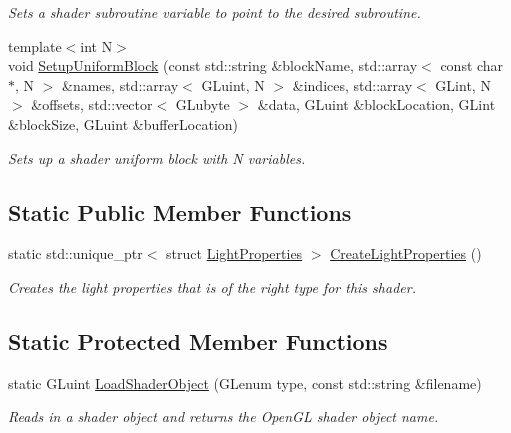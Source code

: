 \begin{DoxyCompactItemize}
\begin{DoxyCompactList}\small\item\em Sets a shader subroutine variable to point to the desired subroutine. \end{DoxyCompactList}\item 
{\footnotesize template$<$int N$>$ }\\void \hyperlink{class_shader_program_aac2a462281a872df0ed8d197ec0b4104}{Setup\+Uniform\+Block} (const std\+::string \&block\+Name, std\+::array$<$ const char $\ast$, N $>$ \&names, std\+::array$<$ G\+Luint, N $>$ \&indices, std\+::array$<$ G\+Lint, N $>$ \&offsets, std\+::vector$<$ G\+Lubyte $>$ \&data, G\+Luint \&block\+Location, G\+Lint \&block\+Size, G\+Luint \&buffer\+Location)
\begin{DoxyCompactList}\small\item\em Sets up a shader uniform block with N variables. \end{DoxyCompactList}\end{DoxyCompactItemize}
\subsection*{Static Public Member Functions}
\begin{DoxyCompactItemize}
\item 
static std\+::unique\+\_\+ptr$<$ struct \hyperlink{struct_light_properties}{Light\+Properties} $>$ \hyperlink{class_shader_program_a9c09a5050b37c958e07ce4d9756421b9}{Create\+Light\+Properties} ()
\begin{DoxyCompactList}\small\item\em Creates the light properties that is of the right type for this shader. \end{DoxyCompactList}\end{DoxyCompactItemize}
\subsection*{Static Protected Member Functions}
\begin{DoxyCompactItemize}
\item 
static G\+Luint \hyperlink{class_shader_program_ab5c50c33203cf65b7f6ffe00d2243d5a}{Load\+Shader\+Object} (G\+Lenum type, const std\+::string \&filename)
\begin{DoxyCompactList}\small\item\em Reads in a shader object and returns the Open\+G\+L shader object name. \end{DoxyCompactList}\end{DoxyCompactItemize}

